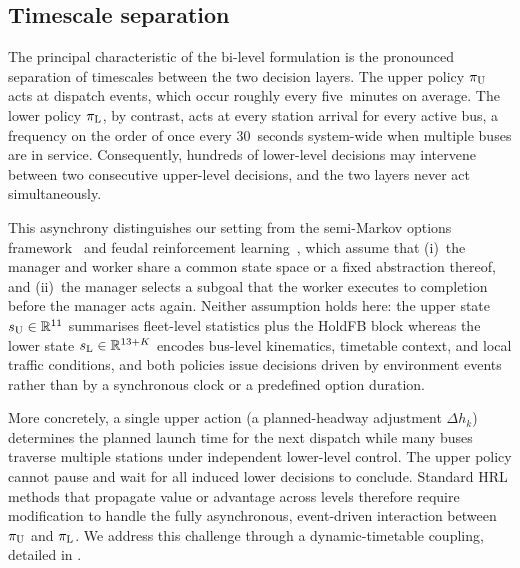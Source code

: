 \subsection{Timescale separation}
\label{sec:timescale}

The principal characteristic of the bi-level formulation is the pronounced separation of timescales between the two decision layers.
The upper policy $\pi_{\mathrm{U}}$ acts at dispatch events, which occur roughly every five~minutes on average.
The lower policy $\pi_{\mathrm{L}}$, by contrast, acts at every station arrival for every active bus, a frequency on the order of once every 30~seconds system-wide when multiple buses are in service.
Consequently, hundreds of lower-level decisions may intervene between two consecutive upper-level decisions, and the two layers never act simultaneously.

This asynchrony distinguishes our setting from the semi-Markov options framework~\citep{sutton1999between} and feudal reinforcement learning~\citep{dayan1992feudal,vezhnevets2017feudal}, which assume that (i)~the manager and worker share a common state space or a fixed abstraction thereof, and (ii)~the manager selects a subgoal that the worker executes to completion before the manager acts again.
Neither assumption holds here: the upper state $s_{\mathrm{U}}\in\mathbb{R}^{11}$ summarises fleet-level statistics plus the HoldFB block whereas the lower state $s_{\mathrm{L}}\in\mathbb{R}^{13+K}$ encodes bus-level kinematics, timetable context, and local traffic conditions, and both policies issue decisions driven by environment events rather than by a synchronous clock or a predefined option duration.

More concretely, a single upper action (a planned-headway adjustment $\Delta h_k$) determines the planned launch time for the next dispatch while many buses traverse multiple stations under independent lower-level control. The upper policy cannot pause and wait for all induced lower decisions to conclude.
Standard HRL methods that propagate value or advantage across levels therefore require modification to handle the fully asynchronous, event-driven interaction between $\pi_{\mathrm{U}}$ and $\pi_{\mathrm{L}}$.
We address this challenge through a dynamic-timetable coupling, detailed in .

